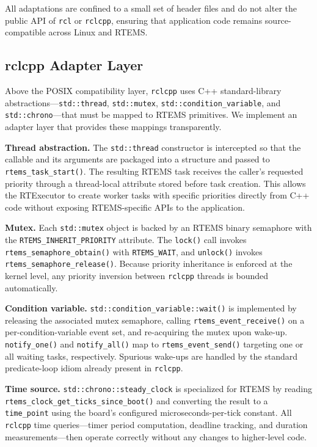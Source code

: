 All adaptations are confined to a small set of header files and do not alter the public API of \texttt{rcl} or \texttt{rclcpp}, ensuring that application code remains source-compatible across Linux and RTEMS.

\subsection{rclcpp Adapter Layer}
\label{subsec:rclcpp_adapter}

Above the POSIX compatibility layer, \texttt{rclcpp} uses C++ standard-library abstractions---\texttt{std::thread}, \texttt{std::mutex}, \texttt{std::condition\_variable}, and \texttt{std::chrono}---that must be mapped to RTEMS primitives.
We implement an adapter layer that provides these mappings transparently.

\textbf{Thread abstraction.}
The \texttt{std::thread} constructor is intercepted so that the callable and its arguments are packaged into a structure and passed to \texttt{rtems\_task\_start()}.
The resulting RTEMS task receives the caller's requested priority through a thread-local attribute stored before task creation.
This allows the RTExecutor to create worker tasks with specific priorities directly from C++ code without exposing RTEMS-specific APIs to the application.

\textbf{Mutex.}
Each \texttt{std::mutex} object is backed by an RTEMS binary semaphore with the \texttt{RTEMS\_INHERIT\_PRIORITY} attribute.
The \texttt{lock()} call invokes \texttt{rtems\_semaphore\_obtain()} with \texttt{RTEMS\_WAIT}, and \texttt{unlock()} invokes \texttt{rtems\_semaphore\_release()}.
Because priority inheritance is enforced at the kernel level, any priority inversion between \texttt{rclcpp} threads is bounded automatically.

\textbf{Condition variable.}
\texttt{std::condition\_variable::wait()} is implemented by releasing the associated mutex semaphore, calling \texttt{rtems\_event\_receive()} on a per-condition-variable event set, and re-acquiring the mutex upon wake-up.
\texttt{notify\_one()} and \texttt{notify\_all()} map to \texttt{rtems\_event\_send()} targeting one or all waiting tasks, respectively.
Spurious wake-ups are handled by the standard predicate-loop idiom already present in \texttt{rclcpp}.

\textbf{Time source.}
\texttt{std::chrono::steady\_clock} is specialized for RTEMS by reading \texttt{rtems\_clock\_get\_ticks\_since\_boot()} and converting the result to a \texttt{time\_point} using the board's configured microseconds-per-tick constant.
All \texttt{rclcpp} time queries---timer period computation, deadline tracking, and duration measurements---then operate correctly without any changes to higher-level code.

